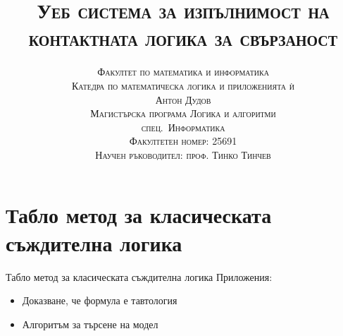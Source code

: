 \documentclass[14pt, aspectratio=169]{beamer}
\date[\today]{}
\title{\textsc{Уеб система за изпълнимост на контактната логика за свързаност}}
\author[Антон Дудов]{
	\textsc{Факултет по математика и информатика} \\
	\textsc{Катедра по математическа логика и приложенията ѝ} \\ [3mm]
	\textsc{Антон Дудов} \\ [3mm]
	\small
	\textsc{Магистърска програма Логика и алгоритми} \\
	\textsc{спец.~Информатика} \\
	\textsc{Факултетен номер: 25691} \\ [3mm]
	\small\textsc{Научен ръководител: проф. Тинко Тинчев}
}
\begin{document}
\begin{frame}
\titlepage
\end{frame}

\begin{frame}
\tableofcontents
\end{frame}

\section{Табло метод за класическата съждителна логика}


\begin{frame}{Табло метод за класическата съждителна логика}
Приложения:
\begin{itemize}
	\item<1-> Доказване, че формула е тавтология

	\item<2-> Алгоритъм за търсене на модел %
\end{itemize}
\end{frame}


\end{document}
